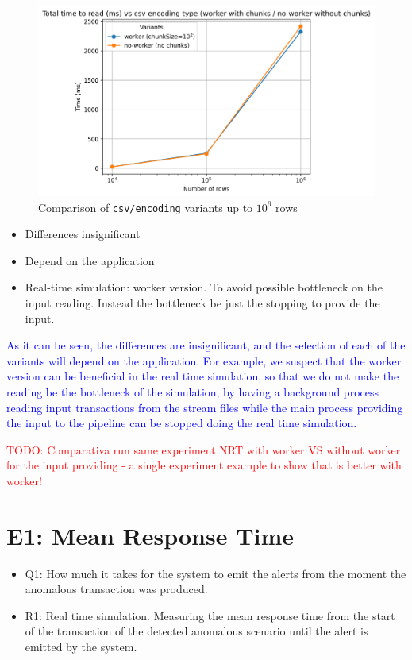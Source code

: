 \documentclass{article}
\begin{document}
\begin{figure}[H]
  \centering
  \includegraphics[scale = 0.7]{images/read-input-csv-encoding.png}
  \caption{Comparison of \texttt{csv/encoding} variants up to $10^6$ rows}
\end{figure}

\begin{itemize}
  \item Differences insignificant
  \item Depend on the application
  \item Real-time simulation: worker version. To avoid possible bottleneck on the input reading. Instead the bottleneck be just the stopping to provide the input.
\end{itemize}

\textcolor{blue}{As it can be seen, the differences are insignificant, and the selection of each of the variants will depend on the application. For example, we suspect that the worker version can be beneficial in the real time simulation, so that we do not make the reading be the bottleneck of the simulation, by having a background process reading input transactions from the stream files while the main process providing the input to the pipeline can be stopped doing the real time simulation.}

\textcolor{red}{TODO: Comparativa run same experiment NRT with worker VS without worker for the input providing - a single experiment example to show that is better with worker!}

\section{E1: Mean Response Time}

\begin{itemize}
  \item Q1: How much it takes for the system to emit the alerts from the moment the anomalous transaction was produced.
  \item R1: Real time simulation. Measuring the mean response time from the start of the transaction of the detected anomalous scenario until the alert is emitted by the system.
\end{itemize}
\end{document}
